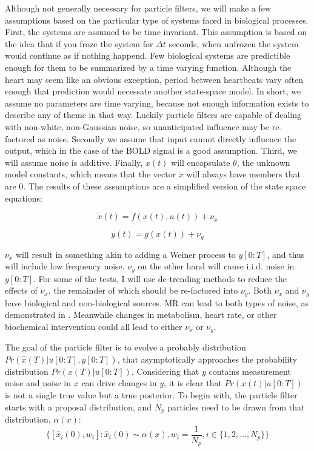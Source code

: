 \documentclass{article}
\begin{document}
Although not generally necessary for particle filters, we will make a few
assumptions based on the particular type of systems faced in biological 
processes. First, the systems are assumed to be time invariant. This 
assumption is based on the idea that if you froze the system for $\Delta t$
seconds, when unfrozen the system would continue as if nothing happend. 
Few biological systems are predictible enough for them to be summarized
by a time varying function. Although the heart may seem like an obvious
exception, period between heartbeats vary often enough that prediction
would necessate another state-space model. In short, we
assume no parameters are time varying, because not enough information exists to
describe any of theme in that way. Luckily particle filters are capable 
of dealing with non-white, non-Gaussian noise, so unanticipated influence
may be re-factored as noise. Secondly we assume that input cannot directly
influence the output, which in the case of the BOLD signal is a good assumption.
Third, we will assume noise is additive.
Finally, $x(t)$ will encapsulate $\theta$, the unknown model constants, which
means that the vector $\dot{x}$ will always have members
that are 0. The results of these assumptions are a simplified version of the
state space equations:

\begin{equation}
\dot{x}(t) = f(x(t), u(t)) + \nu_x
\end{equation}

\begin{equation}
y(t) = g(x(t)) + \nu_y
\end{equation}

$\nu_x$ will result in something akin to adding a Weiner process to $y[0:T]$, and thus
will include low frequency noise. $\nu_y$ on the other hand will cause i.i.d. noise
in $y[0:T]$. For some of the tests, I will use de-trending methods to reduce the effects of 
$\nu_x$, the remainder of which should be re-factored into $\nu_y$. Both $\nu_x$ and $\nu_y$
have biological and non-biological sources. MR can lead to both types of noise, 
as demonstrated in \cite{drift}. Meanwhile changes in metabolism, heart rate, or
other biochemical intervention could all lead to either $\nu_x$ or $\nu_y$.

The goal of the particle filter is to evolve a probably distribution 
$Pr(\hat{x}(T) | u[0:T], y[0:T])$,
that asymptotically approaches the probability distribution $Pr(x(T) | u[0:T])$.
Considering that $y$ contains measurement noise and noise in $x$ can drive
changes in $y$, it is clear that $Pr(x(t) | u[0:T])$ is not a single true value
but a true posterior. 
To begin with, the particle filter starts with a proposal distribution, and $N_p$
particles need to be drawn from that distribution, $\alpha(x)$:
\begin{equation}
\{[\hat{x}_i(0),w_i] : \hat{x}_i(0) \sim \alpha(x), w_i = \frac{1}{N_p}, i \in \{1, 2, ... , N_p\} \}
\end{equation}
\end{document}
